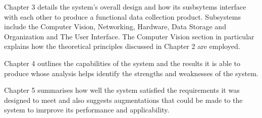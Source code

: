 Chapter 3 details the system's overall design and how its susbsytems interface with each other to produce a functional data collection product. Subsystems include the Computer Vision, Networking, Hardware, Data Storage and Organization and The User Interface. The Computer Vision section in particular explains how the theoretical principles discussed in Chapter 2 are employed.

Chapter 4 outlines the capabilities of the system and the results it is able to produce whose analysis helps identify the strengths and weaknesses of the system.

Chapter 5 summarises how well the system satisfied the requirements it was designed to meet and also suggests augmentations that could be made to the system to imrprove its performance and applicability.



